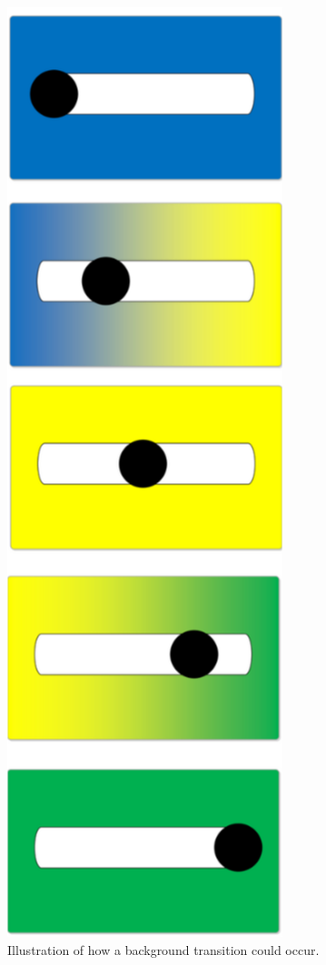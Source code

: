 \documentclass{sigchi}
\begin{document}
        \begin{figure}[h]
            \centering
            \includegraphics[height=\textheight]{figures/background-transition.png}
            \caption{Illustration of how a background transition could occur.}
            \label{fig:mockup4}
        \end{figure}
\end{document}
